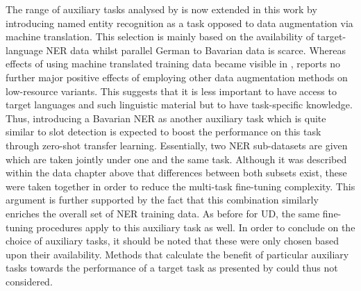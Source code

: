 \documentclass[11pt,a4paper,twoside,openright]{scrbook}
\begin{document}
The range of auxiliary tasks analysed by \citet{van-der-goot-etal-2021-masked} is now extended in this work by introducing named entity recognition as a task opposed to data augmentation via machine translation. This selection is mainly based on the availability of target-language NER data whilst parallel German to Bavarian data is scarce. Whereas effects of using machine translated training data became visible in \citet{van-der-goot-etal-2021-masked}, \citet{kwon-etal-2023-sidlr} reports no further major positive effects of employing other data augmentation methods on low-resource variants. This suggests that it is less important to have access to target languages and such linguistic material but to have task-specific knowledge. Thus, introducing a Bavarian NER as another auxiliary task which is quite similar to slot detection is expected to boost the performance on this task through zero-shot transfer learning. Essentially, two NER sub-datasets are given which are taken jointly under one and the same task. Although it was described within the data chapter above that differences between both subsets exist, these were taken together in order to reduce the multi-task fine-tuning complexity. This argument is further supported by the fact that this combination similarly enriches the overall set of NER training data. As before for UD, the same fine-tuning procedures apply to this auxiliary task as well. In order to conclude on the choice of auxiliary tasks, it should be noted that these were only chosen based upon their availability. Methods that calculate the benefit of particular auxiliary tasks towards the performance of a target task as presented by \citet{schroder-biemann-2020-estimating} could thus not considered.
\end{document}
